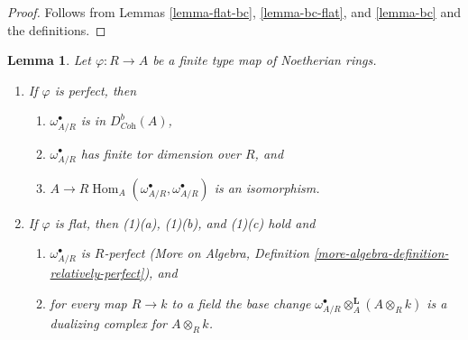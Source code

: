 \documentclass{stacks-project}
\theoremstyle{plain}
\newtheorem{lemma}[subsection]{Lemma}
\theoremstyle{definition}
\theoremstyle{remark}
\numberwithin{equation}{subsection}
\def\Hom{\mathop{\mathrm{Hom}}\nolimits}
\begin{document}
\begin{proof}
Follows from Lemmas \ref{lemma-flat-bc}, \ref{lemma-bc-flat}, and
\ref{lemma-bc} and the definitions.
\end{proof}

\begin{lemma}
\label{lemma-relative-dualizing-algebraic}
Let $\varphi : R \to A$ be a finite type map of Noetherian rings.
\begin{enumerate}
\item If $\varphi$ is perfect, then
\begin{enumerate}
\item $\omega_{A/R}^\bullet$ is in $D^b_{\textit{Coh}}(A)$,
\item $\omega_{A/R}^\bullet$ has finite tor dimension over $R$, and
\item $A \to R\Hom_A(\omega_{A/R}^\bullet, \omega_{A/R}^\bullet)$
is an isomorphism.
\end{enumerate}
\item If $\varphi$ is flat, then (1)(a), (1)(b), and (1)(c) hold and
\begin{enumerate}
\item $\omega_{A/R}^\bullet$ is $R$-perfect
(More on Algebra,
Definition \ref{more-algebra-definition-relatively-perfect}), and
\item for every map $R \to k$ to a field the base change
$\omega_{A/R}^\bullet \otimes_A^\mathbf{L} (A \otimes_R k)$
is a dualizing complex for $A \otimes_R k$.
\end{enumerate}
\end{enumerate}
\end{lemma}
\end{document}
